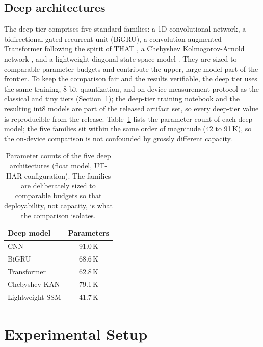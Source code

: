 \documentclass{ieeeaccess}
\begin{document}
\subsection{Deep architectures}
The deep tier comprises five standard families: a 1D convolutional network, a bidirectional gated recurrent unit (BiGRU), a convolution-augmented Transformer following the spirit of THAT \cite{li2021that}, a Chebyshev Kolmogorov-Arnold network \cite{kanorig2024}, and a lightweight diagonal state-space model \cite{gu2023mamba}. They are sized to comparable parameter budgets and contribute the upper, large-model part of the frontier. To keep the comparison fair and the results verifiable, the deep tier uses the same training, 8-bit quantization, and on-device measurement protocol as the classical and tiny tiers (Section~\ref{sec:setup}); the deep-tier training notebook and the resulting int8 models are part of the released artifact set, so every deep-tier value is reproducible from the release. Table~\ref{tab:params} lists the parameter count of each deep model; the five families sit within the same order of magnitude (42 to 91\,K), so the on-device comparison is not confounded by grossly different capacity.

\begin{table}[t]
\caption{Parameter counts of the five deep architectures (float model, UT-HAR configuration). The families are deliberately sized to comparable budgets so that deployability, not capacity, is what the comparison isolates.}
\label{tab:params}
\centering
\footnotesize
\begin{tabular}{lc}
\toprule
Deep model & Parameters \\
\midrule
CNN              & 91.0\,K \\
BiGRU            & 68.6\,K \\
Transformer      & 62.8\,K \\
Chebyshev-KAN    & 79.1\,K \\
Lightweight-SSM  & 41.7\,K \\
\bottomrule
\end{tabular}
\end{table}

\section{Experimental Setup}
\label{sec:setup}
\end{document}
